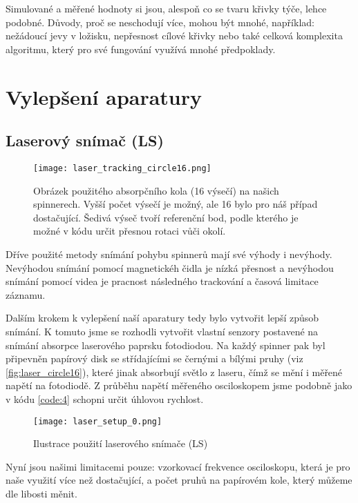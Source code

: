 Simulované a měřené hodnoty si jsou, alespoň co se tvaru křivky týče, lehce podobné. Důvody, proč se neschodují více, mohou být mnohé, například: nežádoucí jevy v ložisku, nepřesnost cílové křivky nebo také celková komplexita algoritmu, který pro své fungování využívá mnohé předpoklady.


\clearpage

\section{Vylepšení aparatury}

\subsection{Laserový snímač (LS)}

\begin{wrapfigure}{r}{0.45\textwidth}
    \vspace*{-0.75cm}
    \texttt{[image: laser\_tracking\_circle16.png]}
    \centering
    \caption[Obrázek použitého absorpčního kola]{Obrázek použitého absorpčního kola (16 výsečí) na našich spinnerech. Vyšší počet výsečí je možný, ale 16 bylo pro náš případ dostačující. Šedivá výseč tvoří referenční bod, podle kterého je možné v kódu určit přesnou rotaci vůči okolí. }
    \label{fig:laser_circle16}
\end{wrapfigure}

Dříve použité metody snímání pohybu spinnerů mají své výhody i nevýhody. Nevýhodou snímání pomocí magnetickéh čidla je nízká přesnost a nevýhodou snímání pomocí videa je pracnost následného trackování a časová limitace záznamu.

Dalším krokem k vylepšení naší aparatury tedy bylo vytvořit lepší způsob snímání. K tomuto jsme se rozhodli vytvořit vlastní senzory postavené na snímání absorpce laserového paprsku fotodiodou. Na každý spinner pak byl připevněn papírový disk  se střídajícími se černými a bílými pruhy (viz \autoref{fig:laser_circle16}), které jinak absorbují světlo z laseru, čímž se mění i měřené napětí na fotodiodě. Z průběhu napětí měřeného osciloskopem jsme podobně jako v kódu \ref{code:4} schopni určit úhlovou rychlost.

\begin{wrapfigure}{r}{0.45\textwidth}
    \texttt{[image: laser\_setup\_0.png]}
    \centering
    \caption{Ilustrace použití laserového snímače (LS)}
    \label{fig:laser_circle16}
\end{wrapfigure}
Nyní jsou našimi limitacemi pouze: vzorkovací frekvence osciloskopu, která je pro naše využití více než dostačující, a počet pruhů na papírovém kole, který můžeme dle libosti měnit.

